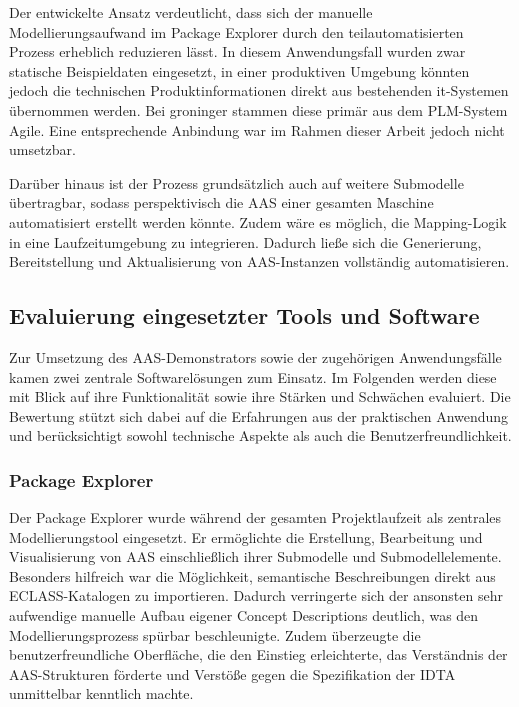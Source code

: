 Der entwickelte Ansatz verdeutlicht, dass sich der manuelle Modellierungsaufwand im Package Explorer durch den teilautomatisierten Prozess erheblich reduzieren lässt. 
In diesem Anwendungsfall wurden zwar statische Beispieldaten eingesetzt, in einer produktiven Umgebung könnten jedoch die technischen Produktinformationen direkt aus bestehenden \acs{it}-Systemen übernommen werden. 
Bei groninger stammen diese primär aus dem PLM-System Agile. 
Eine entsprechende Anbindung war im Rahmen dieser Arbeit jedoch nicht umsetzbar.

Darüber hinaus ist der Prozess grundsätzlich auch auf weitere Submodelle übertragbar, sodass perspektivisch die AAS einer gesamten Maschine automatisiert erstellt werden könnte. 
Zudem wäre es möglich, die Mapping-Logik in eine Laufzeitumgebung zu integrieren. 
Dadurch ließe sich die Generierung, Bereitstellung und Aktualisierung von AAS-Instanzen vollständig automatisieren.

\newpage
\subsection{Evaluierung eingesetzter Tools und Software}
\label{subsec:EvaluierungTools}
Zur Umsetzung des AAS-Demonstrators sowie der zugehörigen Anwendungsfälle kamen zwei zentrale Softwarelösungen zum Einsatz.
Im Folgenden werden diese mit Blick auf ihre Funktionalität sowie ihre Stärken und Schwächen evaluiert.
Die Bewertung stützt sich dabei auf die Erfahrungen aus der praktischen Anwendung und berücksichtigt sowohl technische Aspekte als auch die Benutzerfreundlichkeit.

\subsubsection{Package Explorer}

Der Package Explorer wurde während der gesamten Projektlaufzeit als zentrales Modellierungstool eingesetzt.
Er ermöglichte die Erstellung, Bearbeitung und Visualisierung von AAS einschließlich ihrer Submodelle und Submodellelemente.
Besonders hilfreich war die Möglichkeit, semantische Beschreibungen direkt aus ECLASS-Katalogen zu importieren.
Dadurch verringerte sich der ansonsten sehr aufwendige manuelle Aufbau eigener Concept Descriptions deutlich, was den Modellierungsprozess spürbar beschleunigte.
Zudem überzeugte die benutzerfreundliche Oberfläche, die den Einstieg erleichterte, das Verständnis der AAS-Strukturen förderte und Verstöße gegen die Spezifikation der IDTA unmittelbar kenntlich machte.

